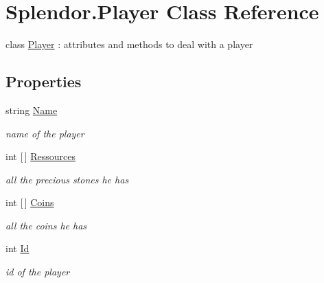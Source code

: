 \hypertarget{class_splendor_1_1_player}{}\section{Splendor.\+Player Class Reference}
\label{class_splendor_1_1_player}


class \mbox{\hyperlink{class_splendor_1_1_player}{Player}} \+: attributes and methods to deal with a player  


\subsection*{Properties}
\begin{DoxyCompactItemize}
\item 
string \mbox{\hyperlink{class_splendor_1_1_player_a15abd489e523e11b6beb4b186783e47f}{Name}}
\begin{DoxyCompactList}\small\item\em name of the player \end{DoxyCompactList}\item 
int \mbox{[}$\,$\mbox{]} \mbox{\hyperlink{class_splendor_1_1_player_a1c5ccd2470e3bbc84e9a156bc323bfd0}{Ressources}}
\begin{DoxyCompactList}\small\item\em all the precious stones he has \end{DoxyCompactList}\item 
int \mbox{[}$\,$\mbox{]} \mbox{\hyperlink{class_splendor_1_1_player_a729fa09f28e378e7934f3ae54ea463e9}{Coins}}
\begin{DoxyCompactList}\small\item\em all the coins he has \end{DoxyCompactList}\item 
int \mbox{\hyperlink{class_splendor_1_1_player_a5616e3562be3e8800f9e959e7cf75194}{Id}}
\begin{DoxyCompactList}\small\item\em id of the player \end{DoxyCompactList}\end{DoxyCompactItemize}


